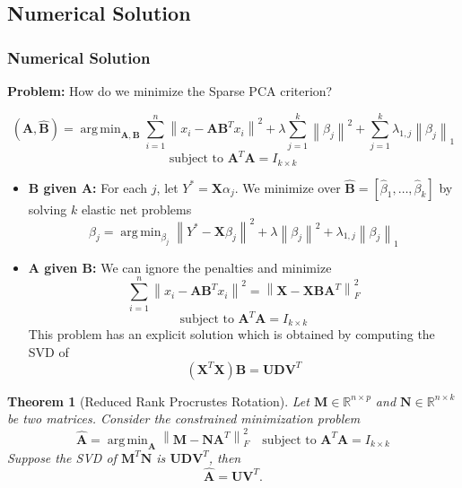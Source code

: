 \documentclass{beamer}
\theoremstyle{plain}
\newtheorem{thm}{Theorem}
\theoremstyle{definition}
\newcommand{\mat}[1]{\mathbf{#1}}
\DeclareMathOperator*{\argmin}{arg\,min}
\newcommand{\norm}[1]{\left\lVert #1 \right\rVert}
\begin{document}
\subsection{Numerical Solution}

\begin{frame}
\frametitle{Numerical Solution}
\textbf{Problem:} How do we minimize the Sparse PCA criterion?\linebreak

$$(\hat{\mat{A}}, \hat{\mat{B}}) = \argmin_{\mat{A}, \mat{B}} \sum_{i=1}^{n} \norm{x_i - \mat{A}\mat{B}^Tx_i}^2 + \lambda \sum_{j=1}^{k}\norm{\beta_j}^2 + \sum_{j=1}^k \lambda_{1,j} \norm{\beta_j}_1$$
$$\text{subject to } \mat{A}^T\mat{A} = I_{k \times k}$$
\end{frame}

\begin{frame}
\begin{itemize}
\item{\textbf{$\mat B$ given $\mat A$:} For each $j$, let $Y^* = \mat X \alpha_j$. We minimize over $\hat{\mat{B}} = \left[ \hat{\beta}_1, \ldots , \hat{\beta}_k\right]$ by solving $k$ elastic net problems
$$\hat{\beta}_j = \argmin_{\beta_j} \norm{Y^* - \mat{X}\beta_j}^2 + \lambda \norm{\beta_j}^2 + \lambda_{1,j} \norm{\beta_j}_1$$} \pause
\item{\textbf{$\mat A$ given $\mat B$:} We can ignore the penalties and minimize
$$\sum_{i=1}^{n} \norm{x_i - \mat{A}\mat{B}^Tx_i}^2 = \norm{\mat{X} - \mat{X} \mat{B} \mat{A}^T}_F^2$$
$$\text{subject to } \mat{A}^T\mat{A} = I_{k \times k}$$
This problem has an explicit solution which is obtained by computing the SVD of
$$(\mat X^T \mat X) \mat B = \mat U \mat D \mat V^T$$
}
\end{itemize}
\end{frame}

\begin{frame}
\begin{thm}[Reduced Rank Procrustes Rotation]
Let $\mat M \in \mathbb{R}^{n \times p}$ and $\mat N \in \mathbb{R}^{n \times k}$ be two matrices. Consider the constrained minimization problem
$$\hat{\mat{A}} = \argmin_{\mat A} \norm{\mat M - \mat N \mat A^T}_F^2 \quad \text{subject to } \mat{A}^T\mat{A} = I_{k \times k}$$
Suppose the SVD of $\mat M^T \mat N$ is $\mat U \mat D \mat V^T$, then 
$$\hat{\mat{A}} = \mat U \mat V^T.$$
\end{thm}
\end{frame}
\end{document}
